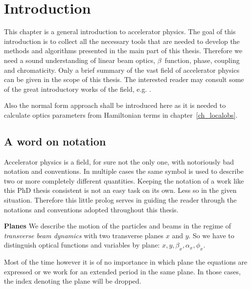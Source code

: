 \chapter{Introduction}

\lohead{\leftmark}
\rehead{\rightmark}
\setcounter{page}{1}

\begin{chapterinfo}
    This chapter is a general introduction to accelerator physics.
    The goal of this introduction is to collect all the necessary tools that are needed to develop
    the methods and algorithms presented in the main part of this thesis.
    Therefore we need a sound understanding of linear beam optics, 
    $\beta$~function, phase, coupling and chromaticity.
    Only a brief summary of the vast field of accelerator physics can be given in the scope of this
    thesis. The interested reader may consult some of the great introductory works of the field, e.g.
    \cite{WolskiBook}.

    Also the normal form approach shall be introduced here as it is needed to calculate optics
    parameters from Hamiltonian terms in chapter~\ref{ch_localobs}.

\end{chapterinfo}

\section{A word on notation}

Accelerator physics is a field, for sure not the only one, with notoriously bad notation and conventions.
In multiple cases the same symbol is used to describe two or more completely different quantities.
Keeping the notation of a work like this PhD thesis consistent is not an easy task on its own. Less so
in the given situation.
Therefore this little prolog serves in guiding the reader through the notations and conventions adopted
throughout this thesis.

\textbf{Planes} We describe the motion of the particles and beams in the regime of \emph{transverse beam dynamics} with
two transverse planes $x$ and $y$.
So we have to distinguish optical functions and variables by plane: $x, y, \beta_x, \alpha_x, \phi_x$.

Most of the time however it is of no importance in which plane the equations
are expressed or we work for an extended period in the same plane.
In those cases, the index denoting the plane will be dropped. 

